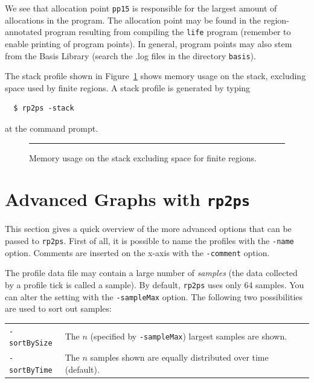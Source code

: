 \documentclass[12pt]{book}
\begin{document}
We see that allocation point \texttt{pp15} is responsible for the
largest amount of allocations in the program. The allocation point may
be found in the region-annotated program resulting from compiling the
{\tt life} program (remember to enable printing of program points). In
general, program points may also stem from the Basis Library (search
the {.log} files in the directory {\tt basis}).

The stack profile shown in Figure~\ref{prof_eks3.fig} shows memory
usage on the stack, excluding space used by finite regions. A
%
%
stack profile is generated by typing
\begin{verbatim}
  $ rp2ps -stack
\end{verbatim}
at the command prompt.

\begin{figure}
\caption{Memory usage on the stack excluding space for finite regions.}
\label{prof_eks3.fig}
\medskip\hrule
\end{figure}

\section{Advanced Graphs with \texttt{rp2ps}}
This section gives a quick overview of the more advanced options that can
be passed to \texttt{rp2ps}. First of all, it is possible to name the
profiles with the
%
{\tt -name} option. Comments are inserted on the
x-axis with the
%
{\tt -comment} option.

The profile data file may contain a large number of \emph{samples}
(the data collected by a profile tick is called a sample). By default,
\texttt{rp2ps} uses only 64 samples. You can alter the setting with the
%
\texttt{-sampleMax} option. The following two possibilities are used to sort
out samples:

\vspace{2mm}
{
\def\arraystretch{1.4}
\begin{tabular}{lp{8cm}}
{\tt -sortBySize} & The $n$ (specified by \texttt{-sampleMax}) largest samples are
shown. %
\index{sortBySize@\texttt{-sortBySize} option} \\
{\tt -sortByTime} & The $n$ samples shown are equally distributed over time (default). %
\index{sortByTime@\texttt{-sortByTime} option}
\end{tabular}
}
\vspace{2mm}
\end{document}
